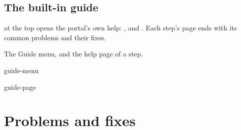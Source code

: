 \documentclass[11pt]{article}
\begin{document}
\subsection{The built-in guide}

 at the top opens the portal's own help: ,  and . Each step's page ends with its common problems and their fixes.

\begin{guidefig}{The Guide menu, and the help page of a step.}
\begin{minipage}[t]{0.3\linewidth}\vspace{0pt}
\begin{shot}{guide-menu}\end{shot}
\end{minipage}\hfill
\begin{minipage}[t]{0.66\linewidth}\vspace{0pt}
\begin{shot}{guide-page}\end{shot}
\end{minipage}
\end{guidefig}

\section{Problems and fixes}\label{sec:problems}
\end{document}
